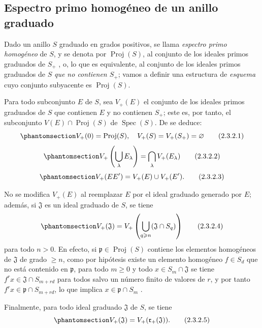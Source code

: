\documentclass[oneside,10pt]{amsart}
\renewcommand{\geq}{\geqslant}
\newcommand{\oldpage}[2][]{\marginnote{\normalfont\footnotesize\textbf{#1}~|~#2}\ignorespaces}
\let\EGAOriginalLabel\label
\renewcommand{\label}[1]{\phantomsection\EGAOriginalLabel{#1}}
\begin{document}
\subsection{Espectro primo homogéneo de un anillo graduado}
\label{subsection:II.2.3-fr}

\begin{env}[2.3.1]
\label{II.2.3.1-fr}
Dado un anillo $S$ graduado en grados positivos, se llama \emph{espectro primo homogéneo} de $S$, y se denota por $\operatorname{Proj}(S)$, al conjunto de los ideales primos graduados de $S_+$ , o, lo que es equivalente, al conjunto de los ideales primos graduados de $S$ \emph{que no contienen $S_+$}; vamos a definir una estructura de \emph{esquema} cuyo conjunto subyacente es $\operatorname{Proj}(S)$.
\end{env}

\begin{env}[2.3.2]
\label{II.2.3.2-fr}
Para todo subconjunto $E$ de $S$, sea $V_+(E)$ el conjunto de los ideales primos graduados de $S$ que contienen $E$ y no contienen $S_+$; este es, por tanto, el subconjunto $V(E)\cap\operatorname{Proj}(S)$ de $\operatorname{Spec}(S)$.
De  se deduce:
\[
  \label{II.2.3.2.1-fr}
  V_+(0)=\operatorname{Proj}(S),\quad
  V_+(S)=V_+(S_+)=\varnothing
  \tag{2.3.2.1}
\]
\[
  \label{II.2.3.2.2-fr}
  V_+\left(\bigcup_\lambda E_\lambda\right)
  =\bigcap_\lambda V_+(E_\lambda)
  \tag{2.3.2.2}
\]
\[
  \label{II.2.3.2.3-fr}
  V_+(EE')=V_+(E)\cup V_+(E').
  \tag{2.3.2.3}
\]

No se modifica $V_+(E)$ al reemplazar $E$ por el ideal graduado generado por $E$; además, si $\mathfrak{J}$ es un ideal graduado de $S$, se tiene
\[
  \label{II.2.3.2.4-fr}
  V_+(\mathfrak{J})
  =V_+\left(\bigcup_{q\geq n}(\mathfrak{J}\cap S_q)\right)
  \tag{2.3.2.4}
\]
\oldpage[II]{26}
para todo $n>0$.
En efecto, si $\mathfrak{p}\in\operatorname{Proj}(S)$ contiene los elementos homogéneos de $\mathfrak{J}$ de grado $\geq n$, como por hipótesis existe un elemento homogéneo $f\in S_d$ que no está contenido en $\mathfrak{p}$, para todo $m\geq 0$ y todo $x\in S_m\cap\mathfrak{J}$ se tiene $f^r x\in\mathfrak{J}\cap S_{m+rd}$ para todos salvo un número finito de valores de $r$, y por tanto $f^r x\in\mathfrak{p}\cap S_{m+rd}$, lo que implica $x\in\mathfrak{p}\cap S_m$ .

Finalmente, para todo ideal graduado $\mathfrak{J}$ de $S$, se tiene
\[
  \label{II.2.3.2.5-fr}
  V_+(\mathfrak{J})=V_+(\mathfrak{r}_+(\mathfrak{J})).
  \tag{2.3.2.5}
\]
\end{env}
\end{document}

